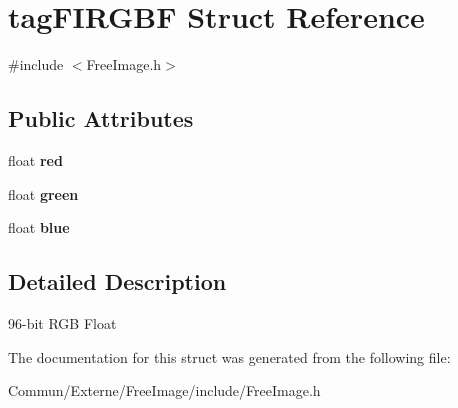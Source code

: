 \hypertarget{structtag_f_i_r_g_b_f}{}\section{tag\+F\+I\+R\+G\+BF Struct Reference}
\label{structtag_f_i_r_g_b_f}


{\ttfamily \#include $<$Free\+Image.\+h$>$}

\subsection*{Public Attributes}
\begin{DoxyCompactItemize}
\item 
float {\bfseries red}\hypertarget{structtag_f_i_r_g_b_f_ab15fa4a5afe84d7d66e598a1c1a17ffa}{}\label{structtag_f_i_r_g_b_f_ab15fa4a5afe84d7d66e598a1c1a17ffa}

\item 
float {\bfseries green}\hypertarget{structtag_f_i_r_g_b_f_ac062604601e6b4da84deb02a29287774}{}\label{structtag_f_i_r_g_b_f_ac062604601e6b4da84deb02a29287774}

\item 
float {\bfseries blue}\hypertarget{structtag_f_i_r_g_b_f_a18cf7966f5a4f5ffd0820aa5a18f8362}{}\label{structtag_f_i_r_g_b_f_a18cf7966f5a4f5ffd0820aa5a18f8362}

\end{DoxyCompactItemize}


\subsection{Detailed Description}
96-\/bit R\+GB Float 

The documentation for this struct was generated from the following file\+:\begin{DoxyCompactItemize}
\item 
Commun/\+Externe/\+Free\+Image/include/Free\+Image.\+h\end{DoxyCompactItemize}
